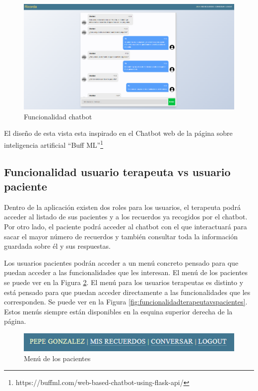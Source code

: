 \begin{figure}[h]
	\centering
	\includegraphics[scale=0.4]{Imagenes/Vectorial/funcionalidad_chatbot}
	\caption{Funcionalidad chatbot}
	\label{fig:funcionalidadchatbot}
\end{figure}

El diseño de esta vista esta inspirado en el Chatbot web de la página sobre inteligencia artificial ``Buff ML''\footnote{https://buffml.com/web-based-chatbot-using-flask-api/}

\subsection{Funcionalidad usuario terapeuta vs usuario paciente}

Dentro de la aplicación existen dos roles para los usuarios, el terapeuta podrá acceder al listado de sus pacientes y a los recuerdos ya recogidos por el chatbot. Por otro lado, el paciente podrá acceder al chatbot con el que interactuará para sacar el mayor número de recuerdos y también consultar toda la información guardada sobre él y sus respuestas.

Los usuarios pacientes podrán acceder a un menú concreto pensado para que puedan acceder a las funcionalidades que les interesan. El menú de los pacientes se puede ver en la Figura \ref{fig:funcionalidad_terapeutavspaciente2}. El menú para los usuarios terapeutas es distinto y está pensado para que puedan acceder directamente a las funcionalidades que les corresponden. Se puede ver en la Figura \ref{fig:funcionalidadterapeutavspacientes}. Estos menús siempre están disponibles en la esquina superior derecha de la página.

\begin{figure}[h]
	\centering
	\includegraphics[scale=1.0]{Imagenes/Vectorial/funcionalidad_terapeutavspaciente2}
	\caption{Menú de los pacientes}
	\label{fig:funcionalidad_terapeutavspaciente2}
\end{figure}

